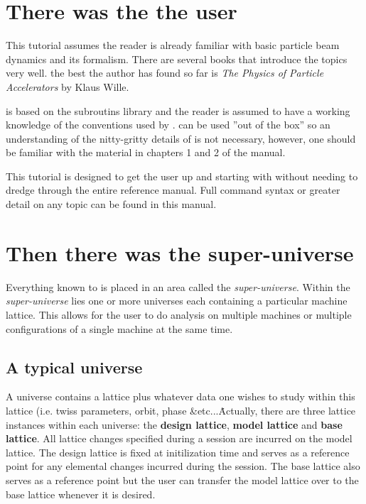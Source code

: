 \documentclass{book}
\begin{document}
\section{There was the the user}

This tutorial assumes the reader is already familiar with basic particle beam
dynamics and its formalism. There are several books that introduce the topics
very well. the best the author has found so far is \textit{The Physics of
Particle Accelerators} by Klaus Wille. 

\tao is based on the \bmad subroutins library and the reader is assumed to have
a working knowledge of the conventions used by \bmad. \tao can be used ''out of
the box'' so an understanding of the nitty-gritty details of \bmad is not
necessary, however, one should be familiar with the material in chapters 1 and 2
of the \bmad manual.


This tutorial is designed to get the user up and starting with \tao without
needing to dredge through the entire reference manual. Full command syntax
or greater detail on any topic can be found in this manual.

\section{Then there was the super-universe}

Everything known to \tao is placed in an area called the
\textit{super-universe}. Within the \textit{super-universe} lies one or more
universes each containing a particular machine lattice. This allows for the user
to do analysis on multiple machines or multiple configurations of a single
machine at the same time. 

\subsection{A typical universe}
A universe contains a \bmad lattice plus whatever data one wishes to study
within this lattice (i.e. twiss parameters, orbit, phase \&etc...\. Actually,
there are three lattice instances within each universe: the \textbf{design
lattice}, \textbf{model lattice} and \textbf{base lattice}. All lattice changes
specified during a session are incurred on the model lattice. The design lattice is
fixed at initilization time and serves as a reference point for any elemental
changes incurred during the \tao session. The base lattice also serves as a
reference point but the user can transfer the model lattice over to the base
lattice whenever it is desired.
\end{document}
